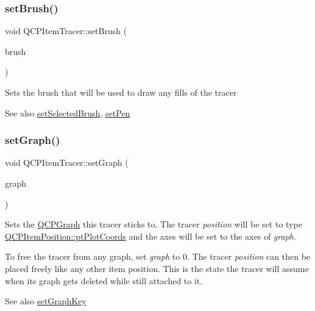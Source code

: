 \subsubsection{\texorpdfstring{set\+Brush()}{setBrush()}}
{\footnotesize\ttfamily void Q\+C\+P\+Item\+Tracer\+::set\+Brush (\begin{DoxyParamCaption}\item[{const Q\+Brush \&}]{brush }\end{DoxyParamCaption})}

Sets the brush that will be used to draw any fills of the tracer

\begin{DoxySeeAlso}{See also}
\hyperlink{class_q_c_p_item_tracer_a0f55c084980a7a312af859d3e7b558ef}{set\+Selected\+Brush}, \hyperlink{class_q_c_p_item_tracer_af8048636fc1ef0152e51809b008df2ca}{set\+Pen} 
\end{DoxySeeAlso}
\mbox{\label{class_q_c_p_item_tracer_af5886f4ded8dd68cb4f3388f390790c0}} 
\subsubsection{\texorpdfstring{set\+Graph()}{setGraph()}}
{\footnotesize\ttfamily void Q\+C\+P\+Item\+Tracer\+::set\+Graph (\begin{DoxyParamCaption}\item[{\hyperlink{class_q_c_p_graph}{Q\+C\+P\+Graph} $\ast$}]{graph }\end{DoxyParamCaption})}

Sets the \hyperlink{class_q_c_p_graph}{Q\+C\+P\+Graph} this tracer sticks to. The tracer {\itshape position} will be set to type \hyperlink{class_q_c_p_item_position_aad9936c22bf43e3d358552f6e86dbdc8ae797603bd91e9561c0f2da044a30e5c6}{Q\+C\+P\+Item\+Position\+::pt\+Plot\+Coords} and the axes will be set to the axes of {\itshape graph}.

To free the tracer from any graph, set {\itshape graph} to 0. The tracer {\itshape position} can then be placed freely like any other item position. This is the state the tracer will assume when its graph gets deleted while still attached to it.

\begin{DoxySeeAlso}{See also}
\hyperlink{class_q_c_p_item_tracer_a6840143b42f3b685cedf7c6d83a704c8}{set\+Graph\+Key} 
\end{DoxySeeAlso}
\mbox{\label{class_q_c_p_item_tracer_a6840143b42f3b685cedf7c6d83a704c8}} 
